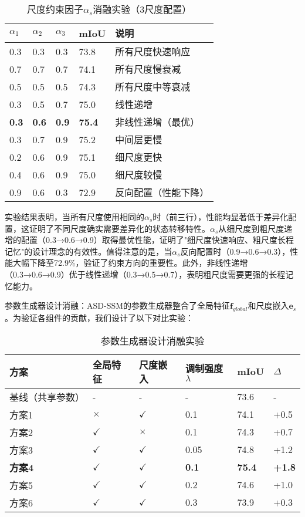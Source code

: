 \documentclass[preprint,12pt]{elsarticle}
\begin{document}
\begin{table}[htbp!]
	\centering
	\caption{尺度约束因子$\alpha_s$消融实验（3尺度配置）}
	\label{tab:alpha_ablation}
	\begin{tabular}{@{}lllll@{}}
		\toprule
		$\alpha_1$ & $\alpha_2$ & $\alpha_3$ & mIoU & 说明 \\ 
		\midrule
		0.3 & 0.3 & 0.3 & 73.8 & 所有尺度快速响应 \\
		0.7 & 0.7 & 0.7 & 74.1 & 所有尺度慢衰减 \\
		0.5 & 0.5 & 0.5 & 74.3 & 所有尺度中等衰减 \\
		\midrule
		0.3 & 0.5 & 0.7 & 75.0 & 线性递增 \\
		\textbf{0.3} & \textbf{0.6} & \textbf{0.9} & \textbf{75.4} & 非线性递增（最优） \\
		0.3 & 0.7 & 0.9 & 75.2 & 中间层更慢 \\
		0.2 & 0.6 & 0.9 & 75.1 & 细尺度更快 \\
		0.4 & 0.6 & 0.9 & 75.0 & 细尺度较慢 \\
		\midrule
		0.9 & 0.6 & 0.3 & 72.9 & 反向配置（性能下降） \\
		\bottomrule
	\end{tabular}
\end{table}

实验结果表明，当所有尺度使用相同的$\alpha_s$时（前三行），性能均显著低于差异化配置，这证明了不同尺度确实需要差异化的状态转移特性。$\alpha_s$从细尺度到粗尺度递增的配置（0.3→0.6→0.9）取得最优性能，证明了"细尺度快速响应、粗尺度长程记忆"的设计理念的有效性。值得注意的是，当$\alpha_s$反向配置时（0.9→0.6→0.3），性能大幅下降至72.9\%，验证了约束方向的重要性。此外，非线性递增（0.3→0.6→0.9）优于线性递增（0.3→0.5→0.7），表明粗尺度需要更强的长程记忆能力。

参数生成器设计消融：ASD-SSM的参数生成器整合了全局特征$\mathbf{f}_{global}$和尺度嵌入$\mathbf{e}_s$。为验证各组件的贡献，我们设计了以下对比实验：

\begin{table}[htbp!]
	\centering
	\caption{参数生成器设计消融实验}
	\label{tab:paramgen_design}
	\begin{tabular}{@{}llllll@{}}
		\toprule
		方案 & 全局特征 & 尺度嵌入 & 调制强度$\lambda$ & mIoU & $\Delta$ \\ 
		\midrule
		基线（共享参数） & - & - & - & 73.6 & - \\
		\midrule
		方案1 & $\times$ & $\checkmark$ & 0.1 & 74.1 & +0.5 \\
		方案2 & $\checkmark$ & $\times$ & 0.1 & 74.3 & +0.7 \\
		方案3 & $\checkmark$ & $\checkmark$ & 0.05 & 74.8 & +1.2 \\
		\textbf{方案4} & $\checkmark$ & $\checkmark$ & \textbf{0.1} & \textbf{75.4} & \textbf{+1.8} \\
		方案5 & $\checkmark$ & $\checkmark$ & 0.2 & 74.6 & +1.0 \\
		方案6 & $\checkmark$ & $\checkmark$ & 0.3 & 73.9 & +0.3 \\
		\bottomrule
	\end{tabular}
\end{table}
\end{document}
